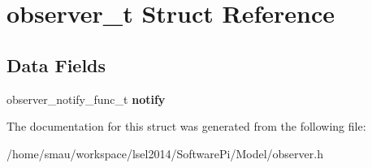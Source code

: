 \hypertarget{structobserver__t}{\section{observer\-\_\-t Struct Reference}
\label{structobserver__t}
}
\subsection*{Data Fields}
\begin{DoxyCompactItemize}
\item 
\hypertarget{structobserver__t_a6e0609db648e1d340f29dfb60a8ba368}{observer\-\_\-notify\-\_\-func\-\_\-t {\bfseries notify}}\label{structobserver__t_a6e0609db648e1d340f29dfb60a8ba368}

\end{DoxyCompactItemize}


The documentation for this struct was generated from the following file\-:\begin{DoxyCompactItemize}
\item 
/home/smau/workspace/lsel2014/\-Software\-Pi/\-Model/observer.\-h\end{DoxyCompactItemize}
